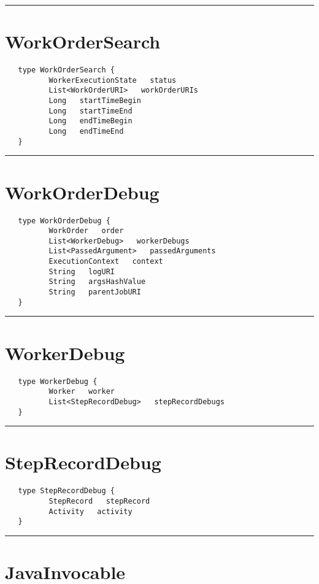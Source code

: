 \rule{15cm}{2pt}
\section{WorkOrderSearch}
\label{type:WorkOrderSearch}

\begin{verbatim}
   type WorkOrderSearch {
          WorkerExecutionState   status
          List<WorkOrderURI>   workOrderURIs
          Long   startTimeBegin
          Long   startTimeEnd
          Long   endTimeBegin
          Long   endTimeEnd
   }
\end{verbatim}

\rule{15cm}{2pt}
\section{WorkOrderDebug}
\label{type:WorkOrderDebug}

\begin{verbatim}
   type WorkOrderDebug {
          WorkOrder   order
          List<WorkerDebug>   workerDebugs
          List<PassedArgument>   passedArguments
          ExecutionContext   context
          String   logURI
          String   argsHashValue
          String   parentJobURI
   }
\end{verbatim}

\rule{15cm}{2pt}
\section{WorkerDebug}
\label{type:WorkerDebug}

\begin{verbatim}
   type WorkerDebug {
          Worker   worker
          List<StepRecordDebug>   stepRecordDebugs
   }
\end{verbatim}

\rule{15cm}{2pt}
\section{StepRecordDebug}
\label{type:StepRecordDebug}

\begin{verbatim}
   type StepRecordDebug {
          StepRecord   stepRecord
          Activity   activity
   }
\end{verbatim}

\rule{15cm}{2pt}
\section{JavaInvocable}
\label{type:JavaInvocable}

